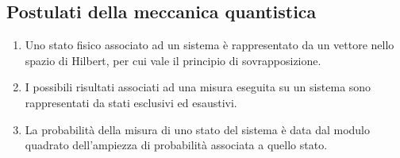 \subsection{Postulati della meccanica quantistica}
\begin{enumerate}
  \item Uno stato fisico associato ad un sistema è rappresentato da un vettore
    nello spazio di Hilbert, per cui vale il principio di sovrapposizione.
  \item I possibili risultati associati ad una misura eseguita su un sistema
    sono rappresentati da stati esclusivi ed esaustivi.
  \item La probabilità della misura di uno stato del sistema è data dal modulo
    quadrato dell'ampiezza di probabilità associata a quello stato.
\end{enumerate}